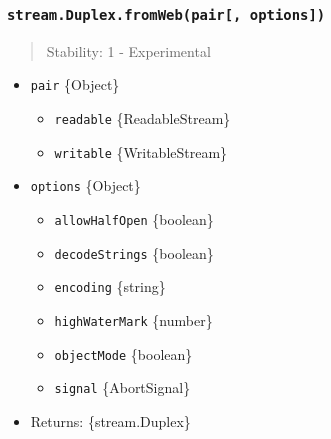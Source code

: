 \begin{Shaded}
\begin{Highlighting}[]
\OperatorTok{=} \NormalTok{(}\NormalTok{)}\OperatorTok{;}

\NormalTok{([}
   \KeywordTok{=\textgreater{}} \NormalTok{(}\NormalTok{(}\StringTok{\textquotesingle{}1\textquotesingle{}}\NormalTok{)}\OperatorTok{,} \NormalTok{))}\OperatorTok{,}
   \NormalTok{((\_}\OperatorTok{,}\KeywordTok{=\textgreater{}} \NormalTok{(}\NormalTok{(} \NormalTok{(}\StringTok{\textquotesingle{}2\textquotesingle{}}\NormalTok{))}\OperatorTok{,} \NormalTok{))}\OperatorTok{,} 
\NormalTok{])}\OperatorTok{;}
\end{Highlighting}
\end{Shaded}

\subsubsection{\texorpdfstring{\texttt{stream.Duplex.fromWeb(pair{[},\ options{]})}}{stream.Duplex.fromWeb(pair{[}, options{]})}}\label{stream.duplex.fromwebpair-options}

\begin{quote}
Stability: 1 - Experimental
\end{quote}

\begin{itemize}
\tightlist
\item
  \texttt{pair} \{Object\}

  \begin{itemize}
  \tightlist
  \item
    \texttt{readable} \{ReadableStream\}
  \item
    \texttt{writable} \{WritableStream\}
  \end{itemize}
\item
  \texttt{options} \{Object\}

  \begin{itemize}
  \tightlist
  \item
    \texttt{allowHalfOpen} \{boolean\}
  \item
    \texttt{decodeStrings} \{boolean\}
  \item
    \texttt{encoding} \{string\}
  \item
    \texttt{highWaterMark} \{number\}
  \item
    \texttt{objectMode} \{boolean\}
  \item
    \texttt{signal} \{AbortSignal\}
  \end{itemize}
\item
  Returns: \{stream.Duplex\}
\end{itemize}

